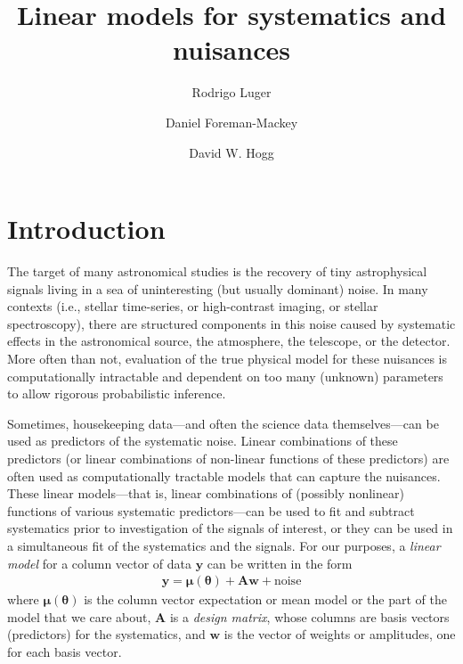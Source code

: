 \documentclass[modern]{rnaastex}
\newcommand{\eqlabel}[1]{\label{eq:#1}}
\newcommand{\bvec}[1]{{\ensuremath{\boldsymbol{#1}}}}
\newcommand{\mA}{\ensuremath{\bvec{A}}}
\newcommand{\vw}{\ensuremath{\bvec{w}}}
\newcommand{\vy}{\ensuremath{\bvec{y}}}
\newcommand{\vm}{\ensuremath{\bvec{\mu}(\bvec{\theta})}}
\begin{document}
\raggedbottom\sloppy\sloppypar\frenchspacing

\title{%
    Linear models for systematics and nuisances
}

\author[0000-0002-0296-3826]{Rodrigo Luger}

\author[0000-0002-9328-5652]{Daniel Foreman-Mackey}

\author[0000-0003-2866-9403]{David W. Hogg}


\section{Introduction}

The target of many astronomical studies is the recovery of tiny astrophysical
signals living in a sea of uninteresting (but usually dominant) noise.
In many contexts (i.e., stellar time-series, or
high-contrast imaging, or stellar spectroscopy), there are structured
components in this noise caused by systematic
effects in the astronomical source, the atmosphere, the telescope, or
the detector.
More often than not, evaluation of the true physical model for these nuisances
is computationally intractable and dependent on too many (unknown) parameters
to allow rigorous probabilistic inference.

Sometimes, housekeeping data---and often the science data themselves---can 
be used as predictors of the systematic noise.
Linear combinations of these predictors (or linear combinations of non-linear functions
of these predictors) are often used as
computationally tractable models that can capture the nuisances.
These linear models---that is, linear combinations of (possibly nonlinear) functions
of various systematic predictors---can be used to fit and subtract systematics prior to
investigation of the signals of interest, or they can be used in a
simultaneous fit of the systematics and the signals.
For our purposes, a \emph{linear model} for a column vector of data $\vy$
can be written in the form
\begin{align}
\eqlabel{linearmodel}
\bvec{y} = \vm + \mA \vw + \mathrm{noise}
\end{align}
where $\vm$ is the column vector expectation or mean model or the part of the model
that we care about, $\mA$ is a \emph{design matrix}, whose columns are basis
vectors (predictors) for the systematics,
and $\vw$ is the vector of weights or amplitudes, one
for each basis vector.
\newpage
\end{document}
